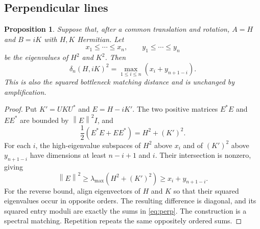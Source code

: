\documentclass[11pt]{article}
\newtheorem{proposition}[theorem]{Proposition}
\theoremstyle{definition}\newtheorem{definition}[theorem]{Definition}
\theoremstyle{remark}\newtheorem{remark}[theorem]{Remark}
\newcommand{\norm}[1]{\left\lVert#1\right\rVert}
\newcommand{\dd}{\delta}
\begin{document}
\subsection{Perpendicular lines}
\begin{proposition}\label{prop:perpendicular}
Suppose that, after a common translation and rotation, $A=H$ and $B=iK$ with $H,K$ Hermitian. Let
\[
 x_1\le\cdots\le x_n,\qquad y_1\le\cdots\le y_n
\]
be the eigenvalues of $H^2$ and $K^2$. Then
\begin{equation}\label{eq:perp}
 \dd_n(H,iK)^2=\max_{1\le i\le n}(x_i+y_{n+1-i}).
\end{equation}
This is also the squared bottleneck matching distance and is unchanged by amplification.
\end{proposition}
\begin{proof}
Put $K'=UKU^*$ and $E=H-iK'$. The two positive matrices $E^*E$ and $EE^*$ are bounded by $\norm E^2 I$, and
\[
 \frac12(E^*E+EE^*)=H^2+(K')^2.
\]
For each $i$, the high-eigenvalue subspaces of $H^2$ above $x_i$ and of $(K')^2$ above $y_{n+1-i}$ have dimensions at least $n-i+1$ and $i$. Their intersection is nonzero, giving
\[
 \norm E^2\ge\lambda_{\max}(H^2+(K')^2)\ge x_i+y_{n+1-i}.
\]
For the reverse bound, align eigenvectors of $H$ and $K$ so that their squared eigenvalues occur in opposite orders. The resulting difference is diagonal, and its squared entry moduli are exactly the sums in \eqref{eq:perp}. The construction is a spectral matching. Repetition repeats the same oppositely ordered sums.
\end{proof}
\end{document}
